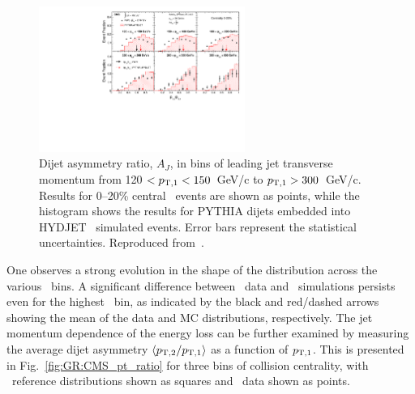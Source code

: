 \begin{figure}[!th]
\begin{center}
\includegraphics[width=0.6\textwidth]{jetfigures/dijet_imbalance5_0to20_pt_20120103_subt.pdf}
\caption{Dijet asymmetry ratio, $A_{J}$, in bins of leading jet transverse momentum from
120 $ < p_{\rm{T},1} < 150$~GeV/c to $p_{\rm{T},1} > 300$~GeV/c.
Results for 0--20\% central \PbPb\ events are shown as points, while the histogram
shows the results for PYTHIA dijets embedded into HYDJET \PbPb\ simulated events.
Error bars represent the statistical uncertainties.  Reproduced from~\cite{CMS_dijet}.}
\label{fig:GR:CMS_dijet_pt}
\end{center}
\end{figure}
One observes a strong evolution in the shape of the distribution across the
various \pT\ bins. A significant difference between \PbPb\ data and
\PYTHYD\ simulations persists even for the highest \pT\ bin, as indicated
by the black and red/dashed arrows showing the mean of the data and
MC distributions, respectively.
The jet momentum dependence of the energy loss can be further examined by measuring the
average dijet asymmetry $\langle p_{\rm{T},2}/p_{\rm{T},1} \rangle$ as a function of $p_{\rm{T},1}$.
This is presented in Fig.~\ref{fig:GR:CMS_pt_ratio} for three bins of collision centrality,
with \PYTHYD\ reference distributions shown as squares and \PbPb\ data shown as points.

